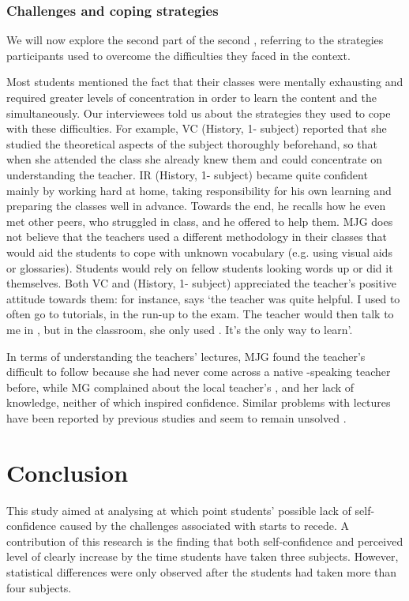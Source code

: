 \documentclass[output=paper]{langsci/langscibook}
\begin{document}
\subsubsection{Challenges and coping strategies} 

We will now explore the second part of the second , referring to the strategies participants used to overcome the difficulties they faced in the  context. 


\newpage 
Most students mentioned the fact that their  classes were mentally exhausting and required greater levels of concentration in order to learn the content and the  simultaneously. Our interviewees told us about the strategies they used to cope with these difficulties. For example, VC (History, 1- subject) reported that she studied the theoretical aspects of the subject thoroughly beforehand, so that when she attended the class she already knew them and could concentrate on understanding the teacher. IR (History, 1- subject) became quite confident mainly by working hard at home, taking responsibility for his own learning and preparing the classes well in advance. Towards the end, he recalls how he even met other peers, who struggled in class, and he offered to help them. MJG does not believe that the teachers used a different methodology in their  classes that would aid the students to cope with unknown vocabulary (e.g. using visual aids or glossaries). Students would rely on fellow students looking words up or did it themselves. Both VC and  (History, 1- subject) appreciated the teacher’s positive attitude towards them: for instance,  says ‘the teacher was quite helpful. I used to often go to tutorials, in the run-up to the exam. The teacher would then talk to me in , but in the classroom, she only used . It’s the only way to learn’.



In terms of understanding the teachers’ lectures, MJG found the teacher’s  difficult to follow because she had never come across a native -speaking teacher before, while MG complained about the local teacher’s , and her lack of  knowledge, neither of which inspired confidence. Similar problems with lectures have been reported by previous studies and seem to remain unsolved \citep{FlowerdewMiller1992, Hellekjaer2010}.


\section{Conclusion} 
\largerpage
This study aimed at analysing at which point students’ possible lack of self-confidence caused by the challenges associated with  starts to recede.  A    contribution of this research is the finding that both  self-confidence and perceived level of  clearly increase by the time students have taken three  subjects. However, statistical differences were only observed after the students had taken more than four subjects. 
\end{document}
